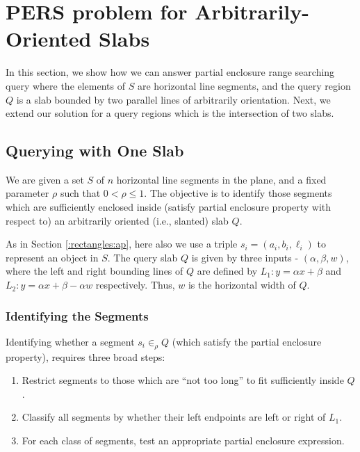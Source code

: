 \section{PERS problem for Arbitrarily-Oriented Slabs}
\label{:slabs}

In this section, we show how we can answer partial enclosure range searching query 
where the elements of $S$ are horizontal line segments, and the query region $Q$ 
is a slab bounded by two parallel lines of arbitrarily orientation. Next, we extend 
our solution for a query regions which is the intersection of two slabs. 

\subsection{Querying with One Slab}
\label{:slabs:one}

\begin{problem}
We are given a set $S$ of $n$ horizontal line segments in the 
plane, and a fixed parameter $\rho$ such that $0 < \rho \leq 1$. 
The objective is to identify those segments which are sufficiently 
enclosed inside (satisfy partial enclosure property with respect 
to) an arbitrarily oriented (i.e., slanted) slab $Q$.
\end{problem}

As in Section \ref{:rectangles:ap}, here also we use a triple 
$s_i=(a_i,b_i,\ell_i)$ to represent an object in $S$. The 
query slab $Q$ is given by three inputs - $(\alpha, \beta, w)$,  
where the left and right bounding lines of $Q$ are defined by 
$L_1 : y = \alpha x + \beta$ and $L_2: y = \alpha x + \beta - 
\alpha w$ respectively. Thus, $w$ is the horizontal width of $Q$.

\subsubsection{Identifying the Segments}
\label{:slabs:one:approach}
Identifying whether a segment $s_i \in_\rho Q$ (which satisfy the partial enclosure property), requires three broad steps:

\begin{enumerate}
\item Restrict segments to those which are ``not too long'' to fit 
sufficiently inside $Q$.
\item Classify all segments by whether their left endpoints are 
left or right of $L_1$.
\item For each class of segments, test an appropriate partial 
enclosure expression.
\end{enumerate}

